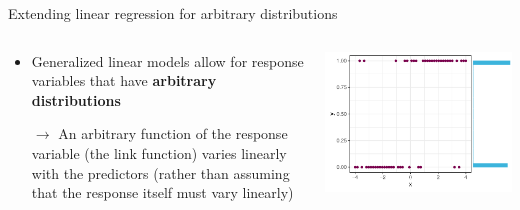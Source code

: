 \documentclass[aspectratio=169]{beamer}
\begin{document}
\begin{frame}{Extending linear regression for arbitrary distributions}
  \begin{columns}
    \begin{column}{.5\textwidth}
      \begin{itemize}
    \item Generalized linear models allow for response variables that have
      \textbf{arbitrary distributions}
    \item[$\to$] An arbitrary function of the response variable (the link function)
      varies linearly with the predictors (rather than assuming that the
          response itself must vary linearly)
      \end{itemize}
    \end{column}
    \begin{column}{.6\textwidth}
        \includegraphics[scale=.7]{../figures/glm_bin}
    \end{column}
  \end{columns}
\end{frame}
\end{document}
